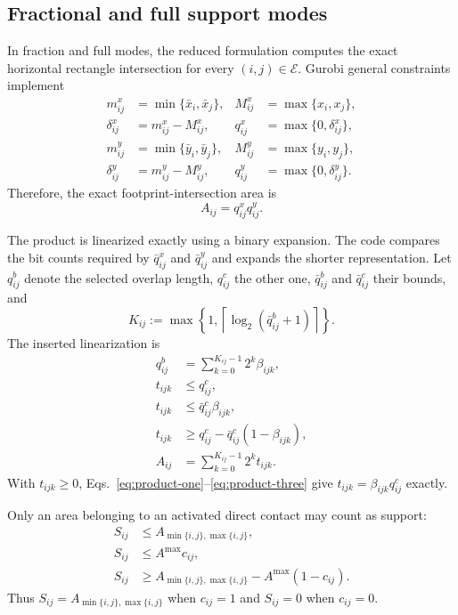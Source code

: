 \documentclass[11pt]{article}
\newcommand{\Pairs}{\mathcal E}
\begin{document}
\subsection{Fractional and full support modes}

In fraction and full modes, the reduced formulation computes the exact
horizontal rectangle intersection for every $(i,j)\in\Pairs$.  Gurobi general
constraints implement
\begin{align}
 m^x_{ij}&=\min\{\bar x_i,\bar x_j\},&
 M^x_{ij}&=\max\{x_i,x_j\},\nonumber\\
 \delta^x_{ij}&=m^x_{ij}-M^x_{ij},&
 q^x_{ij}&=\max\{0,\delta^x_{ij}\},\label{eq:x-overlap-length}\\
 m^y_{ij}&=\min\{\bar y_i,\bar y_j\},&
 M^y_{ij}&=\max\{y_i,y_j\},\nonumber\\
 \delta^y_{ij}&=m^y_{ij}-M^y_{ij},&
 q^y_{ij}&=\max\{0,\delta^y_{ij}\}.
 \label{eq:y-overlap-length}
\end{align}
Therefore, the exact footprint-intersection area is
\begin{equation}
 A_{ij}=q^x_{ij}q^y_{ij}.
 \label{eq:overlap-area}
\end{equation}

The product is linearized exactly using a binary expansion.  The code compares
the bit counts required by $\bar q^x_{ij}$ and $\bar q^y_{ij}$ and expands the
shorter representation.  Let $q^b_{ij}$ denote the selected overlap length,
$q^c_{ij}$ the other one, $\bar q^b_{ij}$ and $\bar q^c_{ij}$ their bounds, and
\begin{equation}
 K_{ij}:=\max\left\{1,
 \left\lceil\log_2(\bar q^b_{ij}+1)\right\rceil\right\}.
\end{equation}
The inserted linearization is
\begin{align}
 q^b_{ij}&=\sum_{k=0}^{K_{ij}-1}2^k\beta_{ijk},\label{eq:binary-overlap}\\
 t_{ijk}&\le q^c_{ij},\label{eq:product-one}\\
 t_{ijk}&\le\bar q^c_{ij}\beta_{ijk},\label{eq:product-two}\\
 t_{ijk}&\ge q^c_{ij}-\bar q^c_{ij}(1-\beta_{ijk}),\label{eq:product-three}\\
 A_{ij}&=\sum_{k=0}^{K_{ij}-1}2^kt_{ijk}.
 \label{eq:area-sum}
\end{align}
With $t_{ijk}\ge0$, Eqs.~\eqref{eq:product-one}--\eqref{eq:product-three}
give $t_{ijk}=\beta_{ijk}q^c_{ij}$ exactly.

Only an area belonging to an activated direct contact may count as support:
\begin{align}
 S_{ij}&\le A_{\min\{i,j\},\max\{i,j\}},\label{eq:support-gate-one}\\
 S_{ij}&\le A^{\max}c_{ij},\label{eq:support-gate-two}\\
 S_{ij}&\ge A_{\min\{i,j\},\max\{i,j\}}-A^{\max}(1-c_{ij}).
 \label{eq:support-gate-three}
\end{align}
Thus $S_{ij}=A_{\min\{i,j\},\max\{i,j\}}$ when $c_{ij}=1$ and $S_{ij}=0$
when $c_{ij}=0$.
\end{document}
